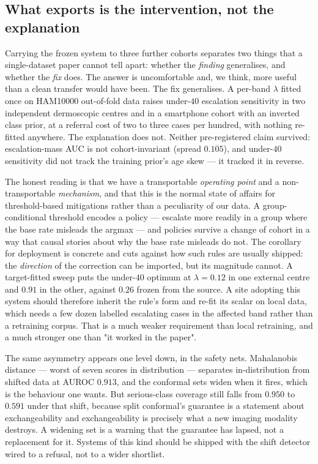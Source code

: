 \documentclass[journal]{IEEEtran}
\begin{document}
\subsection{What exports is the intervention, not the explanation}
Carrying the frozen system to three further cohorts separates two things that a
single-dataset paper cannot tell apart: whether the \emph{finding} generalises, and whether
the \emph{fix} does. The answer is uncomfortable and, we think, more useful than a clean
transfer would have been. The fix generalises. A per-band $\lambda$ fitted once on
HAM10000 out-of-fold data raises under-$40$ escalation sensitivity in two independent
dermoscopic centres and in a smartphone cohort with an inverted class prior, at a referral
cost of two to three cases per hundred, with nothing re-fitted anywhere. The explanation does
not. Neither pre-registered claim survived: escalation-mass AUC is not cohort-invariant
(spread $0.105$), and under-$40$ sensitivity did not track the training prior's age skew ---
it tracked it in reverse.

The honest reading is that we have a transportable \emph{operating point} and a
non-transportable \emph{mechanism}, and that this is the normal state of affairs for
threshold-based mitigations rather than a peculiarity of our data. A group-conditional
threshold encodes a policy --- escalate more readily in a group where the base rate misleads
the argmax --- and policies survive a change of cohort in a way that causal stories about why
the base rate misleads do not. The corollary for deployment is concrete and cuts against how
such rules are usually shipped: the \emph{direction} of the correction can be
imported, but its magnitude cannot. A target-fitted sweep puts the under-$40$ optimum at
$\lambda = 0.12$ in one external centre and $0.91$ in the other, against $0.26$ frozen from
the source. A site adopting this system should therefore inherit the rule's form and re-fit
its scalar on local data, which needs a few dozen labelled escalating cases in the affected
band rather than a retraining corpus. That is a much weaker requirement than local
retraining, and a much stronger one than "it worked in the paper".

The same asymmetry appears one level down, in the safety nets. Mahalanobis distance --- worst
of seven scores in distribution --- separates in-distribution from shifted data at AUROC
$0.913$, and the conformal sets widen when it fires, which is the behaviour one wants. But
serious-class coverage still falls from $0.950$ to $0.591$ under that shift, because split
conformal's guarantee is a statement about exchangeability and exchangeability is precisely
what a new imaging modality destroys. A widening set is a warning that the guarantee has
lapsed, not a replacement for it. Systems of this kind should be shipped with the shift
detector wired to a refusal, not to a wider shortlist.
\end{document}
